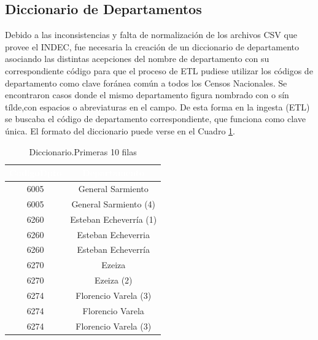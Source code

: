 \documentclass{article}
\theoremstyle{mytheoremstyle}
\theoremstyle{mytheoremstyle}
\theoremstyle{myproblemstyle}
\begin{document}
 \subsection{Diccionario de Departamentos } 
Debido a las inconsistencias y falta de normalización de los archivos CSV que provee el INDEC,
 fue necesaria la creación de un diccionario de departamento asociando las distintas acepciones del nombre de
  departamento con su correspondiente código para que el proceso de ETL pudiese utilizar los códigos de departamento 
  como clave foránea común a todos los Censos Nacionales.
  Se encontraron casos donde el mismo departamento figura nombrado con o sín tílde,con espacios o abreviaturas en el campo. \newline\newline
De esta forma en la ingesta (ETL) se buscaba el código de departamento correspondiente, que funciona como clave única.
 El formato del diccionario puede verse en el Cuadro \ref{tab:diccionario}.
\begin{table}[htb]
  \centering
  \begin{tabular}{|c|c|}
  \hline
  \textbf{\cellcolor[rgb]{0,0.231,0.427}\textcolor{white}{CodigoDpto}} & \textbf{\cellcolor[rgb]{0,0.231,0.427}\textcolor{white}{Departamento}} \\ \hline
  6005 & General Sarmiento \\
  6005 & General Sarmiento (4) \\
  6260 & Esteban Echeverría (1) \\
  6260 & Esteban Echeverria \\
  6260 & Esteban Echeverría \\
  6270 & Ezeiza \\
  6270 & Ezeiza (2) \\
  6274 & Florencio Varela (3)  \\
  6274 & Florencio Varela \\
  6274 & Florencio Varela (3)  \\
  \hline
  \end{tabular}
  \caption{Diccionario.Primeras 10 filas}
  \label{tab:diccionario}
  \end{table}
\end{document}
